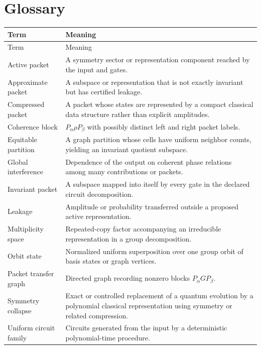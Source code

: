 \chapter{Glossary}

\begin{longtable}{@{}L{.25\textwidth}L{.66\textwidth}@{}}
\toprule
Term & Meaning\\
\midrule
\endfirsthead
\toprule
Term & Meaning\\
\midrule
\endhead
Active packet & A symmetry sector or representation component reached by the input and gates.\\
Approximate packet & A subspace or representation that is not exactly invariant but has certified leakage.\\
Compressed packet & A packet whose states are represented by a compact classical data structure rather than explicit amplitudes.\\
Coherence block & $P_\alpha\rho P_\beta$ with possibly distinct left and right packet labels.\\
Equitable partition & A graph partition whose cells have uniform neighbor counts, yielding an invariant quotient subspace.\\
Global interference & Dependence of the output on coherent phase relations among many contributions or packets.\\
Invariant packet & A subspace mapped into itself by every gate in the declared circuit decomposition.\\
Leakage & Amplitude or probability transferred outside a proposed active representation.\\
Multiplicity space & Repeated-copy factor accompanying an irreducible representation in a group decomposition.\\
Orbit state & Normalized uniform superposition over one group orbit of basis states or graph vertices.\\
Packet transfer graph & Directed graph recording nonzero blocks $P_\alpha G P_\beta$.\\
Symmetry collapse & Exact or controlled replacement of a quantum evolution by a polynomial classical representation using symmetry or related compression.\\
Uniform circuit family & Circuits generated from the input by a deterministic polynomial-time procedure.\\
\bottomrule
\end{longtable}
